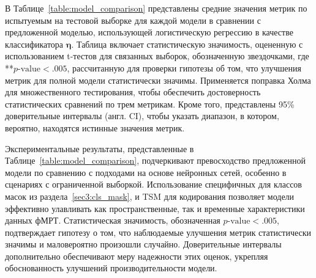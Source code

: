 В Таблице~\ref{table:model_comparison} представлены средние значения метрик по испытуемым на тестовой выборке для каждой модели в сравнении с предложенной моделью, использующей логистическую регрессию в качестве классификатора $\boldsymbol{\eta}$. Таблица включает статистическую значимость, оцененную с использованием t-тестов для связанных выборок, обозначенную звездочками, где **$p\text{-value} < .005$, рассчитанную для проверки гипотезы об том, что улучшения метрик для полной модели статистически значимы. Применяется поправка Холма для множественного тестирования, чтобы обеспечить достоверность статистических сравнений по трем метрикам. Кроме того, представлены 95\% доверительные интервалы (англ. CI), чтобы указать диапазон, в котором, вероятно, находятся истинные значения метрик.

\begin{table}[h!]
    \centering
    \caption{Сравнение модели с подходами на основе нейронных сетей. Метрики усреднены по испытуемым для тестовой выборки, с указанием статистической значимости и доверительных интервалов. Статистическая значимость обозначена звездочками: **$p\text{-value} < .005$.}\label{table:model_comparison}
\end{table}

Экспериментальные результаты, представленные в Таблице~\ref{table:model_comparison}, подчеркивают превосходство предложенной модели по сравнению с подходами на основе нейронных сетей, особенно в сценариях с ограниченной выборкой. Использование специфичных для классов масок из раздела~\ref{sec3:cls_mask}, и TSM для кодирования позволяет модели эффективно улавливать как пространственные, так и временные характеристики данных фМРТ. Статистическая значимость, обозначенная $p\text{-value} < .005$, подтверждает гипотезу о том, что наблюдаемые улучшения метрик статистически значимы и маловероятно произошли случайно. Доверительные интервалы дополнительно обеспечивают меру надежности этих оценок, укрепляя обоснованность улучшений производительности модели.

